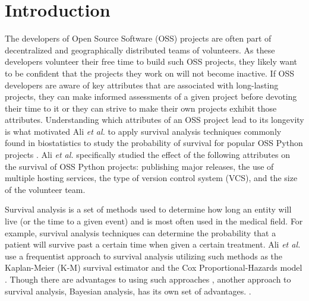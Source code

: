 \documentclass[acmconf]{acmart}
\begin{document}


\maketitle

\section{Introduction} \label{intro}
The developers of Open Source Software (OSS) projects are often part of decentralized and geographically distributed teams of volunteers.
As these developers volunteer their free time to build such OSS projects, they likely want to be confident that the projects they work on will not become inactive.
If OSS developers are aware of key attributes that are associated with long-lasting projects, they can make informed assessments of a given project before devoting their time to it or they can strive to make their own projects exhibit those attributes.
Understanding which attributes of an OSS project lead to its longevity is what motivated Ali \emph{et al.} to apply survival analysis techniques commonly found in biostatistics to study the probability of survival for popular OSS Python projects \cite{ali2020cheating}.
Ali \emph{et al.} specifically studied the effect of the following attributes on the survival of OSS Python projects: publishing major releases, the use of multiple hosting services, the type of version control system (VCS), and the size of the volunteer team.

Survival analysis is a set of methods used to determine how long an entity will live (or the time to a given event) and is most often used in the medical field.
For example, survival analysis techniques can determine the probability that a patient will survive past a certain time when given a certain treatment. 
Ali \emph{et al.} use a frequentist approach to survival analysis utilizing such methods as the Kaplan-Meier (K-M) survival estimator and the Cox Proportional-Hazards model \cite{kaplan1958nonparametric, cox1972regression}.
Though there are advantages to using such approaches , another approach to survival analysis, Bayesian analysis, has its own set of advantages. .
\end{document}
